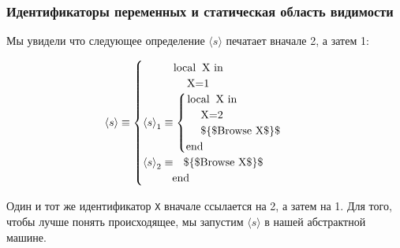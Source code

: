 \subsubsection{Идентификаторы переменных и статическая область видимости}

Мы увидели что следующее определение $\langle s \rangle$ печатает вначале 2, а затем 1:

$$
{\langle s \rangle} \equiv
\begin{cases}
  \text{~~~~~~~~\lstinline|local X in|}\\
  \text{~~~~~~~~~~~~\lstinline|X=1|} \\
       {\langle s \rangle}_{1} \equiv
       \begin{cases}
         \text{\lstinline|local X in|} \\
         \text{~~~~\lstinline|X=2|} \\
         \text{~~~~\lstinline|$\{$Browse X$\}$|} \\
         \text{\lstinline|end|}
       \end{cases} \\
                   {\langle s \rangle}_{2} \equiv \text{~~\lstinline|$\{$Browse X$\}$|} \\
                   \text{~~~~~~~~\lstinline|end|}
\end{cases}
$$

Один и тот же идентификатор \lstinline|X| вначале ссылается на 2, а затем на 1. Для того, чтобы лучше понять происходящее, мы запустим $\langle s \rangle$ в нашей абстрактной машине.

